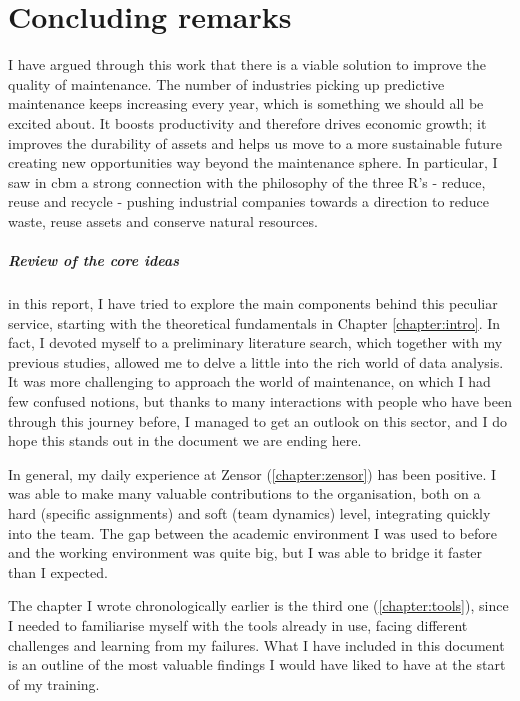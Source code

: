 \chapter{Concluding remarks}
I have argued through this work that there is a viable solution to improve the quality of maintenance. %
The number of industries picking up predictive maintenance keeps increasing every year, which is something we should all be excited about. 
It boosts productivity and therefore drives economic growth; it improves the durability of assets and helps us move to a more sustainable future creating new opportunities way beyond the maintenance sphere.
In particular, I saw in \acl{cbm} a strong connection with the philosophy of the three R's - reduce, reuse and recycle - pushing industrial companies towards a direction to reduce waste, reuse assets and conserve natural resources. 

\paragraph{Review of the core ideas}
in this report, I have tried to explore the main components behind this peculiar service, starting with the theoretical fundamentals in Chapter \ref{chapter:intro}. 
In fact, I devoted myself to a preliminary literature search, which together with my previous studies, allowed me to delve a little into the rich world of data analysis. 
It was more challenging to approach the world of maintenance, on which I had few confused notions, but thanks to many interactions with people who have been through this journey before, 
I managed to get an outlook on this sector, and I do hope this stands out in the document we are ending here.

In general, my daily experience at Zensor (\ref{chapter:zensor}) has been positive. I was able to make many valuable contributions to the organisation, both on a hard (specific assignments) and soft (team dynamics) level, integrating quickly into the team. 
The gap between the academic environment I was used to before and the working environment was quite big, but I was able to bridge it faster than I expected.

The chapter I wrote chronologically earlier is the third one (\ref{chapter:tools}), since I needed to familiarise myself with the tools already in use, facing different challenges and learning from my failures.
What I have included in this document is an outline of the most valuable findings I would have liked to have at the start of my training.

